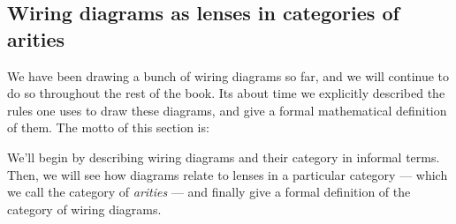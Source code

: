 \documentclass[DynamicalBook]{subfiles}
\begin{document}
\subsection{Wiring diagrams as lenses in categories of arities}\label{sec:wiring.diagrams.as.lenses}


We have been drawing a bunch of wiring diagrams so far, and we will continue to
do so throughout the rest of the book. Its about time we explicitly described
the rules one uses to draw these diagrams, and give a formal mathematical
definition of them. The motto of this section is:

We'll begin by describing wiring diagrams and their category in informal terms.
Then, we will see how diagrams relate to lenses in a particular category --- which we call the
category of \emph{arities} --- and finally give a formal definition of the
category of wiring diagrams.
\end{document}
